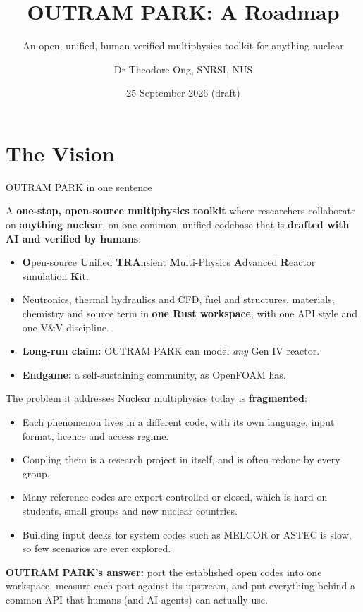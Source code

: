 \documentclass[aspectratio=169]{beamer}
\institute{Singapore Nuclear Research and Safety Institute}
\title[OUTRAM PARK Roadmap]
      {OUTRAM PARK: A Roadmap}
\subtitle{An open, unified, human-verified multiphysics toolkit for
          anything nuclear}
\author{Dr Theodore Ong, SNRSI, NUS}
\date{25 September 2026 \quad (draft)}
\begin{document}
\begin{frame}
    \titlepage
\end{frame}


\section{The Vision}

\begin{frame}{OUTRAM PARK in one sentence}
    \begin{center}
        \large
        A \textbf{one-stop, open-source multiphysics toolkit} where researchers
        collaborate on \textbf{anything nuclear}, on one common, unified
        codebase that is \textbf{drafted with AI and verified by humans}.
    \end{center}

    \medskip
    \begin{itemize}
        \item \textbf{O}pen-source \textbf{U}nified \textbf{TRA}nsient
              \textbf{M}ulti-Physics \textbf{A}dvanced \textbf{R}eactor
              simulation \textbf{K}it.
        \item Neutronics, thermal hydraulics and CFD, fuel and structures,
              materials, chemistry and source term in \textbf{one Rust
              workspace}, with one API style and one V\&V discipline.
        \item \textbf{Long-run claim:} OUTRAM PARK can model \emph{any}
              Gen IV reactor.
        \item \textbf{Endgame:} a self-sustaining community, as OpenFOAM
              has.
    \end{itemize}
\end{frame}

\begin{frame}{The problem it addresses}
    Nuclear multiphysics today is \textbf{fragmented}:

    \medskip
    \begin{itemize}
        \item Each phenomenon lives in a different code, with its own
              language, input format, licence and access regime.
        \item Coupling them is a research project in itself, and is often
              redone by every group.
        \item Many reference codes are export-controlled or closed, which is
              hard on students, small groups and new nuclear countries.
        \item Building input decks for system codes such as MELCOR or ASTEC is slow, so few
              scenarios are ever explored.
    \end{itemize}

    \medskip
    \textbf{OUTRAM PARK's answer:} port the established open codes into one
    workspace, measure each port against its upstream, and put everything
    behind a common API that humans (and AI agents) can actually use.
\end{frame}
\end{document}
